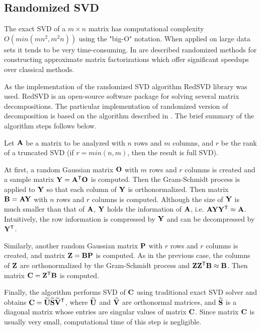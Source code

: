 \subsection{Randomized SVD}

The exact SVD of a $m \times n$ matrix has computational complexity \newline $O(min(mn^2, m^2n))$ using the "big-O" notation. When applied on large data sets it tends to be very time-consuming. In \cite{Holmes2007, Candes2011, Woolfe2008, Martinsson2011} are described randomized methods for constructing approximate matrix factorizations which offer significant speedups over classical methods.

As the implementation of the randomized SVD algorithm RedSVD library was used. RedSVD is an open-source software package for solving several matrix decompositions. The particular implementation of randomized version of decomposition is based on the algorithm described in \cite{Halko2011}. The brief summary of the algorithm steps follows below.

Let $\mathbf{A}$ be a matrix to be analyzed with $n$ rows and $m$ columns, and $r$ be the rank of a truncated SVD (if $r = min(n, m)$, then the result is full SVD).

At first, a random Gaussian matrix $\mathbf{O}$ with $m$ rows and $r$ columns is created and a sample matrix $\mathbf{Y} = \mathbf{A}^{\mathsf{T}} \mathbf{O}$ is computed. Then the Gram-Schmidt process is applied to $\mathbf{Y}$ so that each column of $\mathbf{Y}$ is orthonormalized. Then matrix $\mathbf{B} = \mathbf{A}\mathbf{Y}$ with $n$ rows and $r$ columns is computed. Although the size of $\mathbf{Y}$ is much smaller than that of $\mathbf{A}$, $\mathbf{Y}$ holds the information of $\mathbf{A}$, i.e. $\mathbf{A}\mathbf{Y}\mathbf{Y}^{\mathsf{T}} \approx \mathbf{A}$. Intuitively, the row information is compressed by $\mathbf{Y}$ and can be decompressed by $\mathbf{Y}^{\mathsf{T}}$.

Similarly, another random Gaussian matrix $\mathbf{P}$ with $r$ rows and $r$ columns is created, and matrix $\mathbf{Z} = \mathbf{B}\mathbf{P}$ is computed. As in the previous case, the columns of $\mathbf{Z}$ are orthonormalized by the Gram-Schmidt process and $\mathbf{Z}\mathbf{Z}^{\mathsf{T}} \mathbf{B} \approx \mathbf{B}$. Then matrix $\mathbf{C} = \mathbf{Z}^{\mathsf{T}} \mathbf{B}$ is computed.

Finally, the algorithm performs SVD of $\mathbf{C}$ using traditional exact SVD solver and obtains $\mathbf{C} = \mathbf{\widetilde{U}}\mathbf{\widetilde{S}}\mathbf{\widetilde{V}}^{\mathsf{T}}$, where $\mathbf{\widetilde{U}}$ and $\mathbf{\widetilde{V}}$ are orthonormal matrices, and $\mathbf{\widetilde{S}}$ is a diagonal matrix whose entries are singular values of matrix $\mathbf{C}$. Since matrix $\mathbf{C}$ is usually very small, computational time of this step is negligible.

